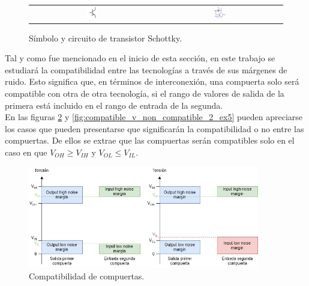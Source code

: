 \begin{figure}[H]
    \centering
    \begin{tabular}{c c}
        \includegraphics[width=0.1\textwidth]{../EJ2/Recursos/schottky_transistor_symbol} &
        \includegraphics[width=0.1\textwidth]{../EJ2/Recursos/schottky_transistor_circuit}
    \end{tabular}
    \caption{Símbolo y circuito de transistor Schottky.}
    \label{fig:schottky_transistor_symbol_and_circuit_ex5}
\end{figure}

Tal y como fue mencionado en el inicio de esta sección, en este trabajo se estudiará la compatibilidad entre las tecnologías a través de sus márgenes de ruido.
Esto significa que, en términos de interconexión, una compuerta solo será compatible con otra de otra tecnología, si el rango de valores de salida de la primera está 
incluido en el rango de entrada de la segunda. \\
En las figuras \ref{fig:compatible_v_non_compatible_ex5} y \ref{fig:compatible_v_non_compatible_2_ex5} pueden apreciarse los casos que pueden presentarse que significarán la compatibilidad o no entre las compuertas.
De ellos se extrae que las compuertas serán compatibles solo en el caso en que $V_{OH} \geq V_{IH}$ y $V_{OL} \leq V_{IL}$.

\begin{figure}[H]
    \centering
    \includegraphics[width=0.9\textwidth]{../EJ2/Recursos/compatible_gates}
    \caption{Compatibilidad de compuertas.}
    \label{fig:compatible_v_non_compatible_ex5}
\end{figure}

